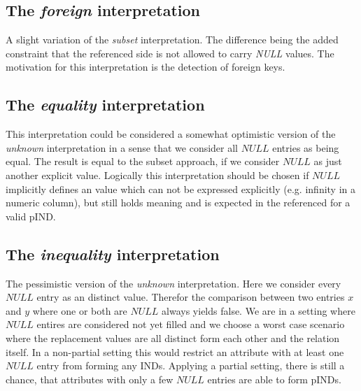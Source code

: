 \subsection*{The \textit{foreign} interpretation}
A slight variation of the \textit{subset} interpretation. The difference being the added constraint that the referenced side is not allowed to
carry \textit{NULL} values. The motivation for this interpretation is the detection of foreign keys.

\subsection*{The \textit{equality} interpretation}
This interpretation could be considered a somewhat optimistic version of the \textit{unknown} interpretation in a sense that we consider all $NULL$ entries as being equal.
The result is equal to the subset approach, if we consider $NULL$ as just another explicit value.
Logically this interpretation should be chosen if $NULL$ implicitly defines an value which can not be expressed explicitly (e.g. infinity in a numeric column), but still holds meaning and is expected in the referenced for a valid pIND.

\subsection*{The \textit{inequality} interpretation}
The pessimistic version of the \textit{unknown} interpretation. Here we consider every $NULL$ entry as an distinct value. Therefor the comparison between two entries $x$ and $y$ where one or both are $NULL$ always yields false. We are in a setting where $NULL$ entires are considered not yet filled and we choose a worst case scenario where the replacement values are all distinct form each other and the relation itself. In a non-partial setting this would restrict an attribute with at least one $NULL$ entry from forming any INDs. Applying a partial setting, there is still a chance, that attributes with only a few $NULL$ entries are able to form pINDs.